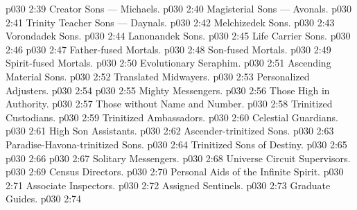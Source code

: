 \vs p030 2:39 \bibnobreakspace Creator Sons --- Michaels.
\vs p030 2:40 \bibnobreakspace Magisterial Sons --- Avonals.
\vs p030 2:41 \bibnobreakspace Trinity Teacher Sons --- Daynals.
\vs p030 2:42 \bibnobreakspace Melchizedek Sons.
\vs p030 2:43 \bibnobreakspace Vorondadek Sons.
\vs p030 2:44 \bibnobreakspace Lanonandek Sons.
\vs p030 2:45 \bibnobreakspace Life Carrier Sons.
\vs p030 2:46 \bibnobreakspace {}
\vs p030 2:47 \bibnobreakspace Father\hyp{}fused Mortals.
\vs p030 2:48 \bibnobreakspace Son\hyp{}fused Mortals.
\vs p030 2:49 \bibnobreakspace Spirit\hyp{}fused Mortals.
\vs p030 2:50 \bibnobreakspace Evolutionary Seraphim.
\vs p030 2:51 \bibnobreakspace Ascending Material Sons.
\vs p030 2:52 \bibnobreakspace Translated Midwayers.
\vs p030 2:53 \bibnobreakspace Personalized Adjusters.
\vs p030 2:54 \bibnobreakspace {}
\vs p030 2:55 \bibnobreakspace Mighty Messengers.
\vs p030 2:56 \bibnobreakspace Those High in Authority.
\vs p030 2:57 \bibnobreakspace Those without Name and Number.
\vs p030 2:58 \bibnobreakspace Trinitized Custodians.
\vs p030 2:59 \bibnobreakspace Trinitized Ambassadors.
\vs p030 2:60 \bibnobreakspace Celestial Guardians.
\vs p030 2:61 \bibnobreakspace High Son Assistants.
\vs p030 2:62 \bibnobreakspace Ascender\hyp{}trinitized Sons.
\vs p030 2:63 \bibnobreakspace Paradise\hyp{}Havona\hyp{}trinitized Sons.
\vs p030 2:64 \bibnobreakspace Trinitized Sons of Destiny.
\vs p030 2:65 \bibnobreakspace{} 
\vs p030 2:66 \bibnobreakspace {}
\vs p030 2:67 \bibnobreakspace Solitary Messengers.
\vs p030 2:68 \bibnobreakspace Universe Circuit Supervisors.
\vs p030 2:69 \bibnobreakspace Census Directors.
\vs p030 2:70 \bibnobreakspace Personal Aids of the Infinite Spirit.
\vs p030 2:71 \bibnobreakspace Associate Inspectors.
\vs p030 2:72 \bibnobreakspace Assigned Sentinels.
\vs p030 2:73 \bibnobreakspace Graduate Guides.
\vs p030 2:74 \bibnobreakspace {}
